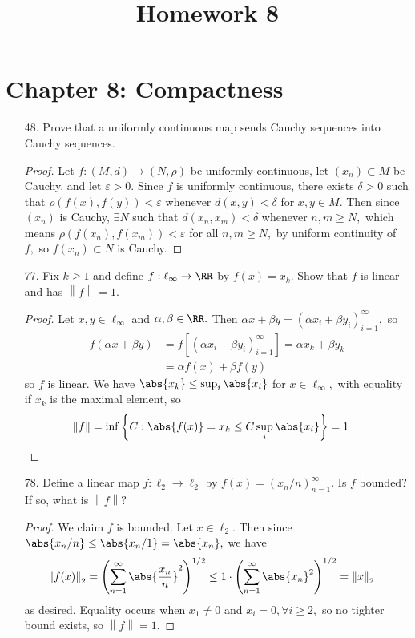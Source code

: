 \documentclass{article}
\begin{document}
\title{Homework 8}
\maketitle
\thispagestyle{fancy}

\section*{Chapter 8: Compactness}

\begin{itemize}
	\item[48.] Prove that a uniformly continuous map sends Cauchy sequences into Cauchy sequences.
		\begin{proof}
			Let $f:(M, d)\to (N, \rho)$ be uniformly continuous, let $(x_n)\subset M$ be Cauchy, and let $\varepsilon>0.$ Since $f$ is uniformly continuous, there exists $\delta>0$ such that $\rho(f(x), f(y))<\varepsilon$ whenever $d(x, y)<\delta$ for $x, y\in M.$ Then since $(x_n)$ is Cauchy, $\exists N$ such that $d(x_n, x_m)<\delta$ whenever $n, m\ge N,$ which means $\rho(f(x_n), f(x_m))<\varepsilon$ for all $n, m\ge N,$ by uniform continuity of $f,$ so $f(x_n)\subset N$ is Cauchy.
		\end{proof}

	\item[77.] Fix $k\ge 1$ and define $f:\ell_\infty\to\RR$ by $f(x)=x_k.$ Show that $f$ is linear and has $\left\lVert f \right\rVert=1.$
		\begin{proof}
			Let $x, y\in \ell_\infty$ and $\alpha, \beta\in\RR.$ Then $\alpha x+\beta y = (\alpha x_i + \beta y_i)_{i=1}^\infty,$ so
			\begin{align*}
				f(\alpha x+\beta y) &= f\left[ (\alpha x_i + \beta y_i)_{i=1}^\infty \right] = \alpha x_k + \beta y_k \\
				&= \alpha f(x) + \beta f(y)
			\end{align*}
			so $f$ is linear. We have $\abs{x_k}\le \sup_i \abs{x_i}$ for $x\in\ell_\infty,$ with equality if $x_k$ is the maximal element, so
			\begin{align*}
				\left\lVert f \right\rVert &= \inf\left\{ C:\abs{f(x)}=x_k\le C\sup_i\abs{x_i} \right\} = 1
			\end{align*}
		\end{proof}

	\item[78.] Define a linear map $f:\ell_2\to\ell_2$ by $f(x)=(x_n/n)_{n=1}^\infty.$ Is $f$ bounded? If so, what is $\left\lVert f \right\rVert?$
		\begin{proof}
			We claim $f$ is bounded. Let $x\in \ell_2.$ Then since $\abs{x_n/n}\le \abs{x_n/1}=\abs{x_n},$ we have
			\begin{align*}
				\left\lVert f(x) \right\rVert_2 &= \left( \sum_{n=1}^{\infty} \abs{\frac{x_n}{n}}^2 \right)^{1/2} \le 1\cdot\left( \sum_{n=1}^{\infty} \abs{x_n}^2 \right)^{1/2} = \left\lVert x \right\rVert_2
			\end{align*}
			as desired. Equality occurs when $x_1\neq 0$ and $x_i=0, \forall i\ge 2,$ so no tighter bound exists, so $\left\lVert f \right\rVert=1.$
		\end{proof}


\end{itemize}
\end{document}

